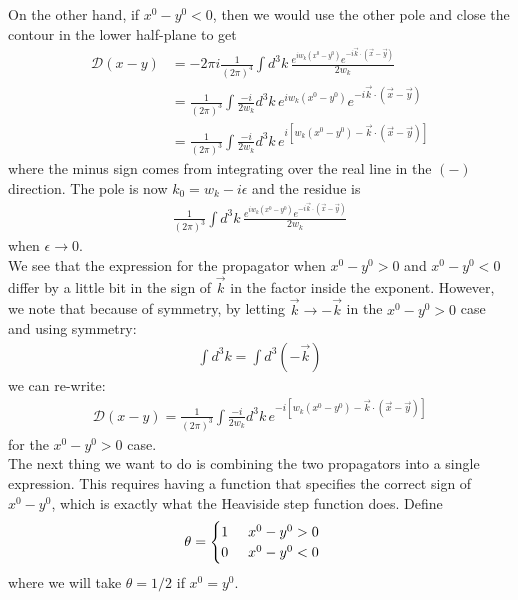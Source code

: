 \documentclass{book}
\theoremstyle{definition}
\newcommand{\f}[2]{\frac{#1}{#2}}
\newcommand{\D}{\mathcal{D}}
\begin{document}
On the other hand, if $x^0 - y^0 <0$, then we would use the other pole and close the contour in the lower half-plane to get
\begin{align}
\D(x-y) &= -2\pi i\f{1}{(2\pi)^4}\int d^3k\, \f{e^{iw_k(x^0 - y^0)}e^{-i\vec{k}\cdot(\vec{x} - \vec{y})}}{2w_k} \\ 
&= \f{1}{(2\pi)^3}\int  \f{-i}{2w_k} d^3k\,e^{iw_k(x^0 - y^0)}e^{-i\vec{k}\cdot(\vec{x} - \vec{y})}  \\
&= \boxed{\f{1}{(2\pi)^3}\int \f{-i}{2w_k}d^3k\,e^{i[w_k(x^0 - y^0) - \vec{k}\cdot(\vec{x} - \vec{y})]}}
\end{align}
where the minus sign comes from integrating over the real line in the $(-)$ direction. The pole is now $k_0 = w_k - i\epsilon$ and the residue is
\begin{align}
\f{1}{(2\pi)^3}\int d^3k\, \f{e^{iw_k(x^0 - y^0)}e^{-i\vec{k}\cdot(\vec{x} - \vec{y})}}{2w_k}
\end{align}
when $\epsilon \to 0$.\\

We see that the expression for the propagator when $x^0 - y^0 > 0$ and $x^0 - y^0 < 0$ differ by a little bit in the sign of $\vec{k}$ in the factor inside the exponent. However, we note that because of symmetry, by letting $\vec{k} \to -\vec{k}$ in the $x^0 - y^0 > 0$ case and using symmetry:
\begin{align}
\int d^3k = \int d^3(-\vec{k})
\end{align}
we can re-write:
\begin{align}
{\D(x-y) = \f{1}{(2\pi)^3} \int \f{-i}{2w_k}d^3k\,e^{-i[w_k(x^0 - y^0) - \vec{k}\cdot(\vec{x} - \vec{y})]}}
\end{align} 
for the $x^0 - y^0 > 0$ case. \\

The next thing we want to do is combining the two propagators into a single expression. This requires having a function that specifies the correct sign of $x^0 - y^0$, which is exactly what the Heaviside step function does. Define
\begin{align}
\theta = \begin{cases}
1 \hspace{0.5cm} x^0 - y^0 > 0\\ 
0 \hspace{0.5cm} x^0 - y^0 < 0
\end{cases}
\end{align}
where we will take $\theta = 1/2$ if $x^0 = y^0$.\\
\end{document}
